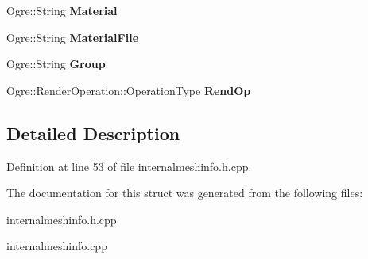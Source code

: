 \begin{DoxyCompactItemize}
\item 
\hypertarget{structphys_1_1internal_1_1MeshInfo_aa01309a572c2a16a9fac89c9c00e4d15}{
Ogre::String {\bfseries Material}}
\label{d2/d55/structphys_1_1internal_1_1MeshInfo_aa01309a572c2a16a9fac89c9c00e4d15}

\item 
\hypertarget{structphys_1_1internal_1_1MeshInfo_a263b58e2329365f89096bd01e9f4176d}{
Ogre::String {\bfseries MaterialFile}}
\label{d2/d55/structphys_1_1internal_1_1MeshInfo_a263b58e2329365f89096bd01e9f4176d}

\item 
\hypertarget{structphys_1_1internal_1_1MeshInfo_a28538b25cd4ff5dbd45639b0ef628db9}{
Ogre::String {\bfseries Group}}
\label{d2/d55/structphys_1_1internal_1_1MeshInfo_a28538b25cd4ff5dbd45639b0ef628db9}

\item 
\hypertarget{structphys_1_1internal_1_1MeshInfo_a9062d5b1782e07c915148fae54b73d6f}{
Ogre::RenderOperation::OperationType {\bfseries RendOp}}
\label{d2/d55/structphys_1_1internal_1_1MeshInfo_a9062d5b1782e07c915148fae54b73d6f}

\end{DoxyCompactItemize}


\subsection{Detailed Description}


Definition at line 53 of file internalmeshinfo.h.cpp.



The documentation for this struct was generated from the following files:\begin{DoxyCompactItemize}
\item 
internalmeshinfo.h.cpp\item 
internalmeshinfo.cpp\end{DoxyCompactItemize}
